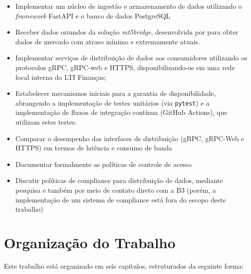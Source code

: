 \begin{itemize}
    \item Implementar um núcleo de ingestão e armazenamento de dados utilizando o \textit{framework} FastAPI e o banco de dados PostgreSQL
    \item Receber dados oriundos da solução \textit{mt5bridge}, desenvolvida por  para obter dados de mercado com atraso mínimo e extremamente atuais.
    \item Implementar serviços de distribuição de dados aos consumidores utilizando os protocolos gRPC, gRPC-web e HTTPS, disponibilizando-os em uma rede local interna do LTI Finanças;
    \item Estabelecer mecanismos iniciais para a garantia de disponibilidade, abrangendo a implementação de testes unitários (via \texttt{pytest}) e a implementação de fluxos de integração contínua (GitHub Actions), que utilizam estes testes.
    \item Comparar o desempenho das interfaces de distribuição (gRPC, gRPC-Web e HTTPS) em termos de latência e consumo de banda
    \item Documentar formalmente as políticas de controle de acesso
    \item Discutir políticas de compliance para distribuição de dados, mediante pesquisa e também por meio de contato direto com a B3 (porém, a implementação de um sistema de compliance está fora do escopo deste trabalho)
\end{itemize}

\newpage
\section{Organização do Trabalho}

Este trabalho está organizado em seis capítulos, estruturados da seguinte forma:

